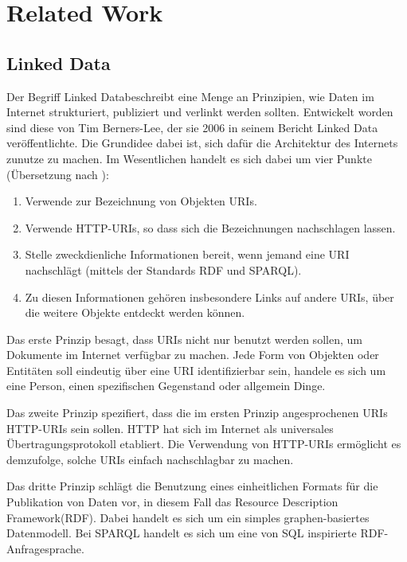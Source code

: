 \section{Related Work}


\subsection{Linked Data}

Der Begriff \glqq Linked Data\grqq beschreibt eine Menge an Prinzipien, wie Daten im Internet strukturiert, publiziert und verlinkt werden sollten. Entwickelt worden sind diese von Tim Berners-Lee, der sie 2006 in seinem Bericht \glqq Linked Data\grqq \cite{linked_data} veröffentlichte. Die Grundidee dabei ist, sich dafür die Architektur des Internets zunutze zu machen. Im Wesentlichen handelt es sich dabei um vier Punkte (Übersetzung nach \cite{wiki_linked_data}):
\begin{enumerate}
\item Verwende zur Bezeichnung von Objekten URIs.
\item Verwende HTTP-URIs, so dass sich die Bezeichnungen nachschlagen lassen.
\item Stelle zweckdienliche Informationen bereit, wenn jemand eine URI nachschlägt (mittels der Standards RDF und SPARQL).
\item Zu diesen Informationen gehören insbesondere Links auf andere URIs, über die weitere Objekte entdeckt werden können.
\end{enumerate}

Das erste Prinzip besagt, dass URIs nicht nur benutzt werden sollen, um Dokumente im Internet verfügbar zu machen. Jede Form von Objekten oder Entitäten soll eindeutig über eine URI identifizierbar sein, handele es sich um eine Person, einen spezifischen Gegenstand oder allgemein \glqq Dinge\grqq.


Das zweite Prinzip spezifiert, dass die im ersten Prinzip angesprochenen URIs HTTP-URIs sein sollen. HTTP hat sich im Internet als universales Übertragungsprotokoll etabliert. Die Verwendung von HTTP-URIs ermöglicht es demzufolge, solche URIs einfach nachschlagbar zu machen.


Das dritte Prinzip schlägt die Benutzung eines einheitlichen Formats für die Publikation von Daten vor, in diesem Fall das \glqq Resource Description Framework\grqq (RDF). Dabei handelt es sich um ein simples graphen-basiertes Datenmodell. Bei SPARQL handelt es sich um eine von SQL inspirierte RDF-Anfragesprache.



